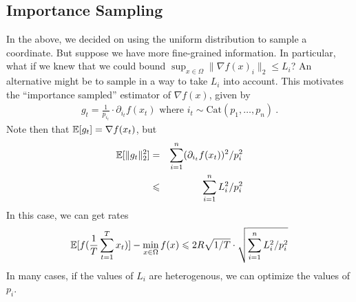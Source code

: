 	\subsection{Importance Sampling}
	In the above, we decided on using the uniform distribution to sample a
  coordinate. But suppose we have more fine-grained information. In particular, what if we knew that we could bound $\sup_{x \in \Omega} \|\nabla f(x)_i\|_2 \le L_i$? An alternative might be to sample in a way to take $L_i$ into account. This motivates the ``importance sampled'' estimator of $\nabla f(x)$, given by
	\begin{eqnarray}
	g_t = \frac{1}{p_{i_t}} \cdot \partial_{i_t}f(x_{t}) \text{ where } i_t \sim
    \mathrm{Cat}(p_1,\dots,p_n) \ .
	\end{eqnarray}
	Note then that $\operatorname*{\mathbb{E}}[g_t] = \nabla f(x_t)$, but
	\begin{eqnarray}
    \operatorname*{\mathbb{E}}[\|g_t\|^2_2]
    &=& \sum_{i=1}^n (\partial_{i_t}f(x_{t}))^2/p_i^2\\
    &\leqslant& \sum_{i=1}^n L_i^2/p_i^2
	\end{eqnarray}
	In this case, we can get rates 
	\begin{eqnarray}
	  \operatorname*{\mathbb{E}}[f(\frac{1}{T}\sum_{t=1}^T x_t)] - \min_{x \in \Omega}f(x)
    \leqslant 2R\sqrt{1/T}\cdot \sqrt{\sum_{i=1}^n L_i^2/p_i^2}
	\end{eqnarray}
	In many cases, if the values of $L_i$ are heterogenous, we can optimize the values of $p_i$. 
